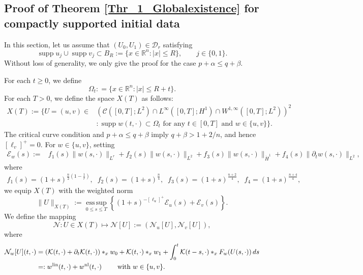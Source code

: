 \documentclass[11pt,reqno]{amsart}
\DeclareMathOperator{\supp}{supp}
\newcommand{\tron}[1]{\left(#1\right)}
\begin{document}
	
	\subsection{Proof of Theorem \ref{Thr_1_Globalexistence} for compactly supported initial data}
	In this section, let us assume that $(U_0,U_1)\in \mathcal{D}_{r}$ satisfying
	\[
	\supp u_j\cup\supp v_j\subset B_{R}:=\{x\in \mathbb{R}^n:|x|\leq R\},\qquad j\in\{0,1\}.
	\]
	Without loss of generality, we only give the proof for the case $p+\alpha\leq q+\beta$.
	
	\medskip{} For each $t\geq 0$, we define
	$$ \Omega_t: = \{x\in \mathbb{R}^n:|x|\leq R+t\}. $$
	For each $T>0$, we define the space $X(T)$ as follows: 
	\begin{align*}
		X(T):=\Big\{U=(u,v)\in&\left(\mathcal{C}([0,T];L^2)\cap L^\infty([0,T]; H^1)\cap W^{1,\infty}([0,T];L^2)\right)^2\\
		&:\supp w(t,\cdot)\subset \Omega_t\text{ for any }t\in[0,T]\text{ and }w\in\{u,v\} \Big\}.
	\end{align*}
	The critical curve condition and $p+\alpha\leq q+\beta$ imply $q+\beta>1+2/n$, and hence $[\ell_v]^+=0$. For $w\in\{u,v\}$, setting
	\[
	\begin{aligned}
		\mathcal E_w(s):=&f_1(s)\|w(s,\cdot)\|_{L^{r}}
		+f_2(s)\|w(s,\cdot)\|_{L^2} +f_3(s)\|w(s,\cdot)\|_{\dot{H}^1}
		+f_4(s)\|\partial_tw(s,\cdot)\|_{L^2},
	\end{aligned}
	\]
	where
	\begin{align*}
		f_1(s)=(1+s)^{\frac{n}{2}\tron{1-\frac{1}{r}}},\;\;f_2(s)=(1+s)^{\frac{n}{4}},\;\;f_3(s)=(1+s)^{\frac{n+2}{4}},\;\;f_4=(1+s)^{\frac{n+4}{4}},
	\end{align*}
	we equip $X(T)$ with the weighted norm
	\[
	\|U\|_{X(T)}:=\operatorname*{ess\,sup}_{0\leq s\leq T}
	\left\{(1+s)^{-[\ell_u]^+}\mathcal E_u(s)+\mathcal E_v(s)\right\}.
	\]
	We define the mapping
	$$\mathcal{N}: U\in X(T)\mapsto \mathcal{N}[U]:=(\mathcal{N}_u[U],\mathcal{N}_v[U]), $$
	where
	\begin{equation}\label{mapN}
		\begin{aligned}
			\mathcal{N}_w[U](t,\cdot)&=(\mathcal{K}(t,\cdot)+\partial_t\mathcal{K}(t,\cdot))\ast_xw_0
			+\mathcal{K}(t,\cdot)\ast_xw_1
			+\int_0^t\mathcal{K}(t-s,\cdot)\ast_xF_w(U(s,\cdot))\,ds\\
			&=:w^{\rm lin}(t,\cdot)+w^{\rm nl}(t,\cdot)\qquad\text{ with } w\in\{u,v\}.
		\end{aligned}
	\end{equation} 
	
\end{document}
